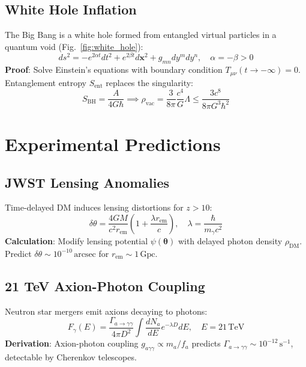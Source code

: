 \documentclass[12pt, a4paper]{article}
\begin{document}
\subsection{White Hole Inflation}  
\label{subsec:inflation}  
The Big Bang is a white hole formed from entangled virtual particles in a quantum void (Fig.~\ref{fig:white_hole}):  
\begin{equation}  
ds^2 = -e^{2\alpha t} dt^2 + e^{2\beta t} d\bm{x}^2 + g_{mn} dy^m dy^n, \quad \alpha = -\beta > 0  
\label{eq:metric}  
\end{equation}  
\textbf{Proof}: Solve Einstein’s equations with boundary condition \( T_{\mu\nu}(t \to -\infty) = 0 \). Entanglement entropy \( S_{\text{ent}} \) replaces the singularity:  
\begin{equation}  
S_{\text{BH}} = \frac{A}{4G\hbar} \implies \rho_{\text{vac}} = \frac{3}{8\pi} \frac{c^4}{G} \Lambda \leq \frac{3c^8}{8\pi G^3 \hbar^2}  
\label{eq:entropy_bound}  
\end{equation}  

\section{Experimental Predictions}  
\label{sec:experiments}  

\subsection{JWST Lensing Anomalies}  
\label{subsec:lensing}  
Time-delayed DM induces lensing distortions for \( z > 10 \):  
\begin{equation}  
\delta \theta = \frac{4GM}{c^2 r_{\text{em}}} \left(1 + \frac{\lambda r_{\text{em}}}{c}\right), \quad \lambda = \frac{\hbar}{m_\gamma c^2}  
\label{eq:lensing}  
\end{equation}  
\textbf{Calculation}: Modify lensing potential \( \psi(\bm{\theta}) \) with delayed photon density \( \rho_{\text{DM}} \). Predict \( \delta \theta \sim 10^{-10} \, \text{arcsec} \) for \( r_{\text{em}} \sim 1 \, \text{Gpc} \).  

\subsection{21 TeV Axion-Photon Coupling}  
\label{subsec:axion}  
Neutron star mergers emit axions decaying to photons:  
\begin{equation}  
F_{\gamma}(E) = \frac{\Gamma_{a \to \gamma\gamma}}{4\pi D^2} \int \frac{dN_a}{dE} e^{-\lambda D} dE, \quad E = 21 \, \text{TeV}  
\label{eq:axion_flux}  
\end{equation}  
\textbf{Derivation}: Axion-photon coupling \( g_{a\gamma\gamma} \propto m_a / f_a \) predicts \( \Gamma_{a \to \gamma\gamma} \sim 10^{-12} \, \text{s}^{-1} \), detectable by Cherenkov telescopes.  
\end{document}
